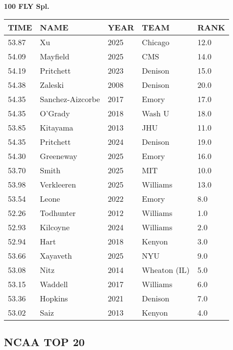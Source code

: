 \begin{center}
\begin{minipage}[t]{0.7\textwidth}
\centering
\textbf{100 FLY Spl.}\\[0.05cm]
\begin{tabular}{@{}p{1.8cm}p{2.8cm}p{1.2cm}p{1.4cm}p{0.8cm}@{}}
\hline
\textbf{TIME} & \textbf{NAME} & \textbf{YEAR} & \textbf{TEAM} & \textbf{RANK} \\
\hline
53.87 & Xu & 2025 & Chicago & 12.0 \\
54.09 & Mayfield & 2025 & CMS & 14.0 \\
54.19 & Pritchett & 2023 & Denison & 15.0 \\
54.38 & Zaleski & 2008 & Denison & 20.0 \\
54.35 & Sanchez-Aizcorbe & 2017 & Emory & 17.0 \\
54.35 & O'Grady & 2018 & Wash U & 18.0 \\
53.85 & Kitayama & 2013 & JHU & 11.0 \\
54.35 & Pritchett & 2024 & Denison & 19.0 \\
54.30 & Greeneway & 2025 & Emory & 16.0 \\
53.70 & Smith & 2025 & MIT & 10.0 \\
53.98 & Verkleeren & 2025 & Williams & 13.0 \\
53.54 & Leone & 2022 & Emory & 8.0 \\
52.26 & Todhunter & 2012 & Williams & 1.0 \\
52.93 & Kilcoyne & 2024 & Williams & 2.0 \\
52.94 & Hart & 2018 & Kenyon & 3.0 \\
53.66 & Xayaveth & 2025 & NYU & 9.0 \\
53.08 & Nitz & 2014 & Wheaton (IL) & 5.0 \\
53.15 & Waddell & 2017 & Williams & 6.0 \\
53.36 & Hopkins & 2021 & Denison & 7.0 \\
53.02 & Saiz & 2013 & Kenyon & 4.0 \\
\hline
\end{tabular}
\end{minipage}
\end{center}

\vspace{0.4cm}

\newpage

\subsection{NCAA TOP 20}

